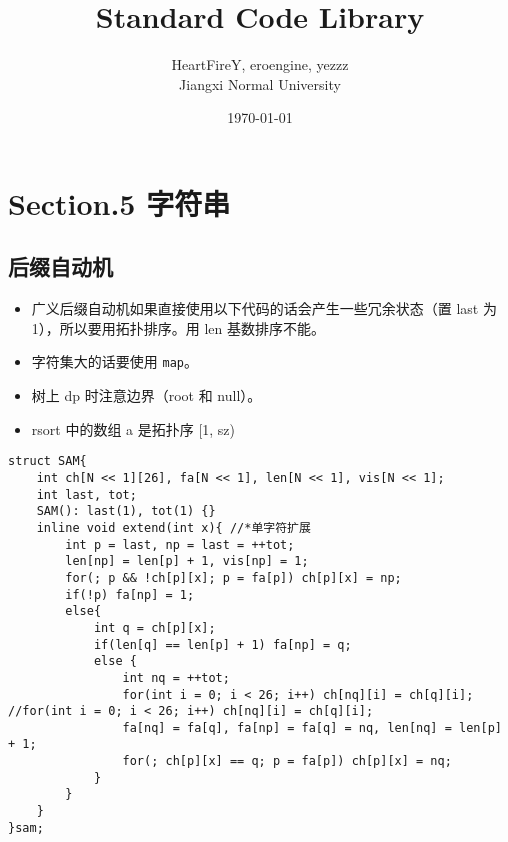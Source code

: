 \documentclass[]{article}
\date{}
\title{\vspace{50mm} \huge Standard Code Library \\[20pt]}
\author{HeartFireY, eroengine, yezzz \\[10pt] Jiangxi Normal University}
\date{\today}
\providecommand{\tightlist}{%
  \setlength{\itemsep}{0pt}\setlength{\parskip}{0pt}}
\begin{document}
\begin{titlepage}

\maketitle

\end{titlepage}

\newpage

\renewcommand\labelitemi{$\bullet$}

{
\setcounter{tocdepth}{3}
\tableofcontents
\newpage
}








\hypertarget{section.5-ux5b57ux7b26ux4e32}{%
\section{Section.5 字符串}\label{section.5-ux5b57ux7b26ux4e32}}

\hypertarget{ux540eux7f00ux81eaux52a8ux673a}{%
\subsection{后缀自动机}\label{ux540eux7f00ux81eaux52a8ux673a}}

\begin{itemize}
\tightlist
\item
  广义后缀自动机如果直接使用以下代码的话会产生一些冗余状态（置 last 为
  1），所以要用拓扑排序。用 len 基数排序不能。
\item
  字符集大的话要使用 \texttt{map}。
\item
  树上 dp 时注意边界（root 和 null）。
\item
  rsort 中的数组 a 是拓扑序 {[}1, sz)
\end{itemize}

\begin{verbatim}
struct SAM{
    int ch[N << 1][26], fa[N << 1], len[N << 1], vis[N << 1];
    int last, tot;
    SAM(): last(1), tot(1) {}
    inline void extend(int x){ //*单字符扩展
        int p = last, np = last = ++tot;
        len[np] = len[p] + 1, vis[np] = 1;
        for(; p && !ch[p][x]; p = fa[p]) ch[p][x] = np;
        if(!p) fa[np] = 1;
        else{
            int q = ch[p][x];
            if(len[q] == len[p] + 1) fa[np] = q;
            else {
                int nq = ++tot;
                for(int i = 0; i < 26; i++) ch[nq][i] = ch[q][i]; //for(int i = 0; i < 26; i++) ch[nq][i] = ch[q][i];
                fa[nq] = fa[q], fa[np] = fa[q] = nq, len[nq] = len[p] + 1;
                for(; ch[p][x] == q; p = fa[p]) ch[p][x] = nq;
            }
        }
    }
}sam;
\end{verbatim}
\end{document}
